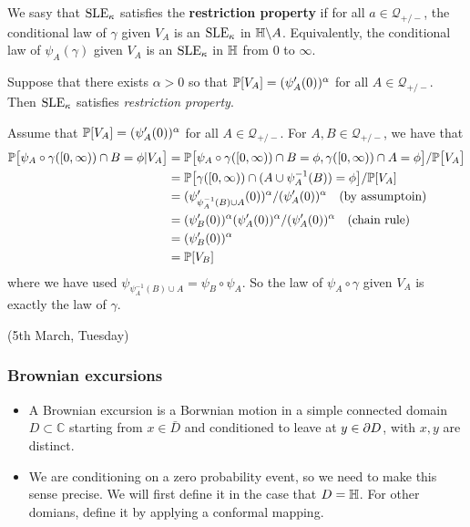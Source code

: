 \documentclass[12pt,a4paper]{article}
\newenvironment{proof}
{\begin{changemargin}{0.5cm}{0.5cm} 
	}%
	{\end{changemargin}
}
\newenvironment{p}
{\begin{proof} 
	}%
	{\end{proof}
}
\begin{document}
 We sasy that $\text{SLE}_{\kappa}$ satisfies the \textbf{restriction property} if for all $a\in \mathscr{Q}_{+/-}$, the conditional law of $\gamma$ given $V_A$ is an $\text{SLE}_{\kappa}$ in $\mathbb{H} \backslash A$. Equivalently, the conditional law of $\psi_A(\gamma)$ given $V_A$ is an $\text{SLE}_{\kappa}$ in $\mathbb{H}$ from 0 to $\infty$. 
\s

\lem Suppose that there exists $\alpha >0$ so that $\mathbb{P}[V_A] = (\psi'_A(0))^{\alpha}$ for all $A\in \mathscr{Q}_{+/-}$. Then $\text{SLE}_{\kappa}$ satisfies \emph{restriction property}. 
\begin{p}
\pf Assume that $\mathbb{P}[V_A] = (\psi'_A(0))^{\alpha}$ for all $A\in \mathscr{Q}_{+/-}$. For $A, B\in \mathscr{Q}_{+/-}$, we have that
\begin{align*}
\mathbb{P} \big[\psi_A \circ \gamma([0,\infty)) \cap B = \phi | V_A \big] &= \mathbb{P} \big[\psi_A \circ \gamma([0,\infty)) \cap B = \phi, \gamma([0, \infty)) \cap A = \phi \big] / \mathbb{P} \big[V_A\big] \\
&= \mathbb{P} \big[\gamma([0, \infty))\cap (A\cup \psi_{A}^{-1}(B)) = \phi \big] / \mathbb{P}[V_A] \\
&= (\psi'_{\psi^{-1}_A (B) \cup A}(0))^{\alpha} / (\psi'_A(0))^{\alpha} \quad \text{(by assumptoin)} \\
&= (\psi'_B(0))^{\alpha}(\psi'_A(0))^{\alpha} / (\psi'_A(0))^{\alpha} \quad \text{(chain rule)} \\
&= (\psi'_B(0))^{\alpha} \\
&= \mathbb{P}[V_B]
\end{align*}
where we have used $\psi_{\psi_A^{-1}(B) \cup A} = \psi_B \circ \psi_A$. So the law of $\psi_A \circ \gamma$ given $V_A$ is exactly the law of $\gamma$.

\eop
\end{p}
\s

\newday

(5th March, Tuesday)
\s

\subsubsection*{Brownian excursions}
\begin{itemize}
\item A Brownian excursion is a Borwnian motion in a simple connected domain $D\subset \mathbb{C}$ starting from $x\in \bar{D}$ and conditioned to leave at $y\in \partial D$, with $x,y$ are distinct.
\item We are conditioning on a zero probability event, so we need to make this sense precise. We will first define it in the case that $D= \mathbb{H}$. For other domians, define it by applying a conformal mapping.
\end{itemize}
\s
\end{document}
